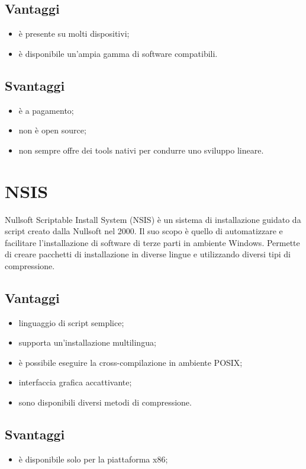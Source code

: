 \subsection*{Vantaggi}
\begin{itemize}
	\item è presente su molti dispositivi;
	\item è disponibile un'ampia gamma di software compatibili.
\end{itemize}
\subsection*{Svantaggi}
\begin{itemize}
	\item è a pagamento;
	\item non è open source;
	\item non sempre offre dei tools nativi per condurre uno sviluppo lineare.
\end{itemize}
\section{NSIS}
Nullsoft Scriptable Install System (NSIS) è un sistema di installazione guidato da script creato dalla Nullsoft nel 2000. Il suo scopo è quello di automatizzare e facilitare l'installazione di software di terze parti in ambiente Windows. Permette di creare pacchetti di installazione in diverse lingue e utilizzando diversi tipi di compressione.
\subsection*{Vantaggi}
\begin{itemize}
	\item linguaggio di script semplice;
	\item supporta un'installazione multilingua;
	\item è possibile eseguire la cross-compilazione in ambiente POSIX;
	\item interfaccia grafica accattivante;
	\item sono disponibili diversi metodi di compressione.
\end{itemize}
\subsection*{Svantaggi}
\begin{itemize}
	\item è disponibile solo per la piattaforma x86;
\end{itemize}
